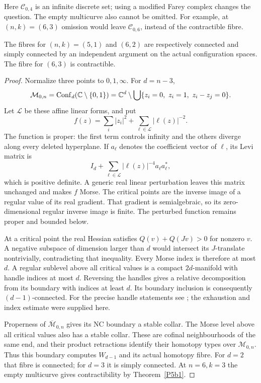 Here \(\mathcal C_{0,4}\) is an infinite discrete set; using a
modified Farey complex changes the question. The empty multicurve
also cannot be omitted. For example, at \((n,k)=(6,3)\) omission
would leave \(\mathcal C_{0,6}\), instead of the contractible fibre.

\begin{proposition}[Independent checks at \(n=5,6\)]\label{P5b3}
The fibres for \((n,k)=(5,1)\) and \((6,2)\) are respectively
connected and simply connected by an independent argument on the
actual configuration spaces. The fibre for \((6,3)\) is contractible.
\end{proposition}

\begin{proof}
Normalize three points to \(0,1,\infty\). For \(d=n-3\),
\[
 \mathcal M_{0,n}
 =\operatorname{Conf}_{d}(\mathbb C\setminus\{0,1\})
 =\mathbb C^d\setminus\bigcup\{z_i=0,\ z_i=1,\ z_i-z_j=0\}.
\]
Let \(\mathcal L\) be these affine linear forms, and put
\[
 f(z)=\sum_i |z_i|^2+\sum_{\ell\in\mathcal L}|\ell(z)|^{-2}.
\]
The function is proper: the first term controls infinity and the
others diverge along every deleted hyperplane. If \(a_\ell\)
denotes the coefficient vector of \(\ell\), its Levi matrix is
\[
                  I_d+\sum_{\ell\in\mathcal L}
                            |\ell(z)|^{-4}a_\ell a_\ell^*,
\]
which is positive definite. A generic real linear perturbation
leaves this matrix unchanged and makes \(f\) Morse.
The critical points are the inverse image of a regular value
of its real gradient. That gradient is semialgebraic, so its
zero-dimensional regular inverse image is finite.
The perturbed function remains proper and bounded below.

At a critical point the real Hessian satisfies
\(Q(v)+Q(Jv)>0\) for nonzero \(v\). A negative subspace of
dimension larger than \(d\) would intersect its \(J\)-translate
nontrivially, contradicting that inequality.
Every Morse index is therefore at most \(d\).
A regular sublevel above all critical values is a compact
\(2d\)-manifold with handle indices at most \(d\). Reversing
the handles gives a relative decomposition from its boundary
with indices at least \(d\). Its boundary inclusion is consequently
\((d-1)\)-connected. For the precise handle statements see
\citet[Theorems 3.2 and 3.5, Remark 3.3, Theorem 7.2, and the
reversed-index proof of Theorem 7.4]{Milnor1963}; the exhaustion
and index estimate were supplied here.

Properness of \(\overline{\mathcal M}_{0,n}\) gives its NC
boundary a stable collar. The Morse level above all critical
values also has a stable collar. These are cofinal neighbourhoods
of the same end, and their product retractions identify their
homotopy types over \(\mathcal M_{0,n}\).
Thus this boundary computes \(W_{d-1}\) and its actual homotopy
fibre. For \(d=2\) that fibre is connected; for \(d=3\) it is
simply connected. At \(n=6,k=3\) the empty multicurve gives
contractibility by Theorem~\ref{P5b1}.


\end{proof}
